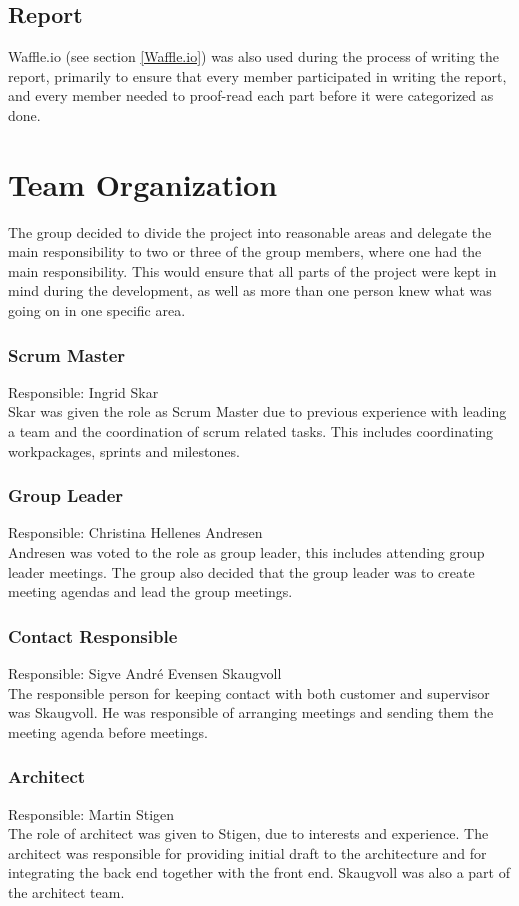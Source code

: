 \subsection{Report}
Waffle.io (see section \ref{Waffle.io}) was also used during the process of writing the report, primarily to ensure that every member participated in writing the report, and every member needed to proof-read each part before it were categorized as done.

\section{Team Organization}\label{projectOrganisation}
The group decided to divide the project into reasonable areas and delegate the main responsibility to two or three of the group members, where one had the main responsibility. This would ensure that all parts of the project were kept in mind during the development, as well as more than one person knew what was going on in one specific area.

\subsubsection{Scrum Master}
Responsible: Ingrid Skar \\
Skar was given the role as Scrum Master due to previous experience with leading a team and the coordination of scrum related tasks. This includes coordinating workpackages, sprints and milestones.

\subsubsection{Group Leader}
Responsible: Christina Hellenes Andresen \\
Andresen was voted to the role as group leader, this includes attending group leader meetings. The group also decided that the group leader was to create meeting agendas and lead the group meetings. 

\subsubsection{Contact Responsible}
Responsible: Sigve André Evensen Skaugvoll \\
The responsible person for keeping contact with both customer and supervisor was Skaugvoll. He was responsible of arranging meetings and sending them the meeting agenda before meetings.

\subsubsection{Architect}
Responsible: Martin Stigen \\
The role of architect was given to Stigen, due to interests and experience. The architect was responsible for providing initial draft to the architecture and for integrating the back end together with the front end. Skaugvoll was also a part of the architect team.

